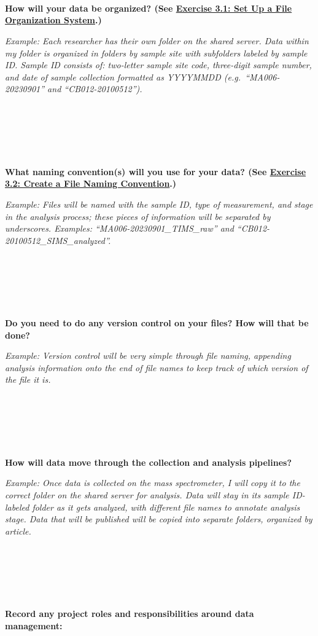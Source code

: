 \documentclass[
]{book}
\begin{document}
~

~

~

\textbf{How will your data be organized? (See \protect\hyperlink{file-organization}{Exercise 3.1: Set Up a File Organization System}.)}

\emph{Example: Each researcher has their own folder on the shared server. Data within my folder is organized in folders by sample site with subfolders labeled by sample ID. Sample ID consists of: two-letter sample site code, three-digit sample number, and date of sample collection formatted as YYYYMMDD (e.g.~``MA006-20230901'' and ``CB012-20100512'').}

~

~

~

\textbf{What naming convention(s) will you use for your data? (See \protect\hyperlink{file-naming}{Exercise 3.2: Create a File Naming Convention}.)}

\emph{Example: Files will be named with the sample ID, type of measurement, and stage in the analysis process; these pieces of information will be separated by underscores. Examples: ``MA006-20230901\_TIMS\_raw'' and ``CB012-20100512\_SIMS\_analyzed''.}

~

~

~

\textbf{Do you need to do any version control on your files? How will that be done?}

\emph{Example: Version control will be very simple through file naming, appending analysis information onto the end of file names to keep track of which version of the file it is.}

~

~

~

\textbf{How will data move through the collection and analysis pipelines?}

\emph{Example: Once data is collected on the mass spectrometer, I will copy it to the correct folder on the shared server for analysis. Data will stay in its sample ID-labeled folder as it gets analyzed, with different file names to annotate analysis stage. Data that will be published will be copied into separate folders, organized by article.}

~

~

~

\textbf{Record any project roles and responsibilities around data management:}
\end{document}
